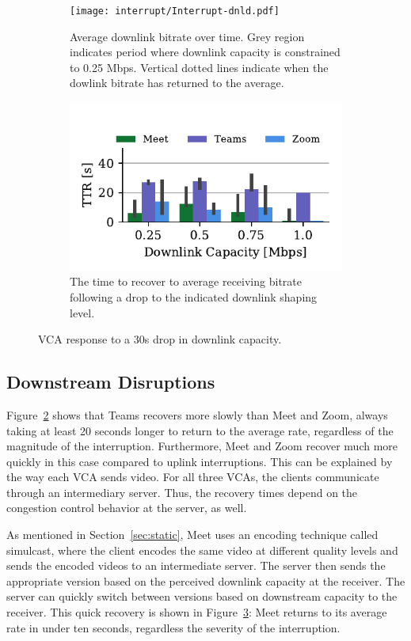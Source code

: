 \begin{figure}[t!]
 \centering
\begin{subfigure}[t]{.5\textwidth}
   \centering
    \texttt{[image: interrupt/Interrupt-dnld.pdf]}
    \caption{Average downlink bitrate over time. Grey region indicates period where downlink capacity is constrained to 0.25 Mbps. Vertical dotted lines indicate when the dowlink bitrate has returned to the average.}
    \label{fig:ts-dnld}
\end{subfigure}
\begin{subfigure}[t]{.5\textwidth}
  \centering
    \includegraphics[width=.9\textwidth,keepaspectratio]{figures/interrupt/TTR-dnld.pdf}
    \caption{The time to recover to average receiving bitrate following a drop to the indicated downlink shaping level.}
    \label{fig:TTR_dnld}
\end{subfigure}
\caption{VCA response to a 30s drop in downlink capacity.}
\label{fig:interrupt-dnld}
\end{figure}

\subsection{Downstream Disruptions}

Figure~\ref{fig:TTR_dnld} shows that Teams recovers more slowly than Meet and
Zoom, always taking at least 20 seconds longer to return to the average rate,
regardless of the magnitude of the interruption. Furthermore, Meet and Zoom
recover much more quickly in this case compared to uplink interruptions. This
can be explained by the way each VCA sends video. For all three VCAs, the
clients communicate through an intermediary server. Thus, the recovery times
depend on the congestion control behavior at the server, as well. 

As mentioned in Section~\ref{sec:static}, Meet uses an encoding technique
called simulcast, where the client encodes the same video at different quality
levels and sends the encoded videos to an intermediate server. The server then
sends the appropriate version based on the perceived downlink capacity at the
receiver. The server can quickly switch between versions based on downstream
capacity to the receiver. This quick recovery is shown in
Figure~\ref{fig:interrupt-dnld}: Meet returns to its average rate in under ten
seconds, regardless the severity of the interruption.

